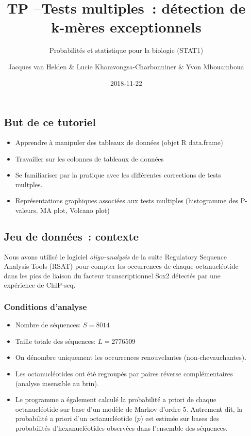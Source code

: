 \documentclass[]{article}
\title{TP --Tests multiples~: détection de k-mères exceptionnels}
\subtitle{Probabilités et statistique pour la biologie (STAT1)}
\author{Jacques van Helden \& Lucie Khamvongsa-Charbonniner \& Yvon Mbouamboua}
\date{2018-11-22}
\providecommand{\tightlist}{%
  \setlength{\itemsep}{0pt}\setlength{\parskip}{0pt}}
\begin{document}
\maketitle

{
\setcounter{tocdepth}{3}
\tableofcontents
}
\subsection{But de ce tutoriel}\label{but-de-ce-tutoriel}

\begin{itemize}
\tightlist
\item
  Apprendre à manipuler des tableaux de données (objet R data.frame)
\item
  Travailler sur les colonnes de tableaux de données
\item
  Se familiariser par la pratique avec les différentes corrections de
  tests multples.
\item
  Représentations graphiques associées aux tests multiples (histogramme
  des P-valeurs, MA plot, Volcano plot)
\end{itemize}

\subsection{Jeu de données~: contexte}\label{jeu-de-donnees-contexte}

Nous avons utilisé le logiciel \emph{oligo-analysis} de la suite
Regulatory Sequence Analysis Tools (RSAT) pour compter les occurrences
de chaque octanucléotide dans les pics de liaison du facteur
transcriptionnel Sox2 détectés par une expérience de ChIP-seq.

\subsubsection{Conditions d'analyse}\label{conditions-danalyse}

\begin{itemize}
\item
  Nombre de séquences: \(S = 8014\)
\item
  Taille totale des séquences: \(L = 2776509\)
\item
  On dénombre uniquement les occurrences renouvelantes
  (non-chevauchantes).
\item
  Les octanucléotides ont été regroupés par paires réverse
  complémentaires (analyse insensible au brin).
\item
  Le programme a également calculé la probabilité a priori de chaque
  octanucléotide sur base d'un modèle de Markov d'ordre 5. Autrement
  dit, la probabilité a priori d'un octanucléotide (\(p\)) est estimée
  sur bases des probabilités d'hexanucléotides observées dans l'ensemble
  des séquences.
\end{itemize}
\end{document}
